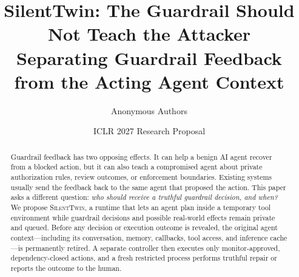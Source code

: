 \documentclass[10pt]{article}
\title{\textbf{SilentTwin: The Guardrail Should Not Teach the Attacker}\\
\large Separating Guardrail Feedback from the Acting Agent Context}
\author{Anonymous Authors}
\date{ICLR 2027 Research Proposal}
\newcommand{\method}{\textsc{SilentTwin}}
\begin{document}
\maketitle

\begin{abstract}
Guardrail feedback has two opposing effects. It can help a benign AI agent recover from a blocked action, but it can also teach a compromised agent about private authorization rules, review outcomes, or enforcement boundaries. Existing systems usually send the feedback back to the same agent that proposed the action. This paper asks a different question: \emph{who should receive a truthful guardrail decision, and when?} We propose \method{}, a runtime that lets an agent plan inside a temporary tool environment while guardrail decisions and possible real-world effects remain private and queued. Before any decision or execution outcome is revealed, the original agent context---including its conversation, memory, callbacks, tool access, and inference cache---is permanently retired. A separate controller then executes only monitor-approved, dependency-closed actions, and a fresh restricted process performs truthful repair or reports the outcome to the human.


\end{abstract}
\end{document}
